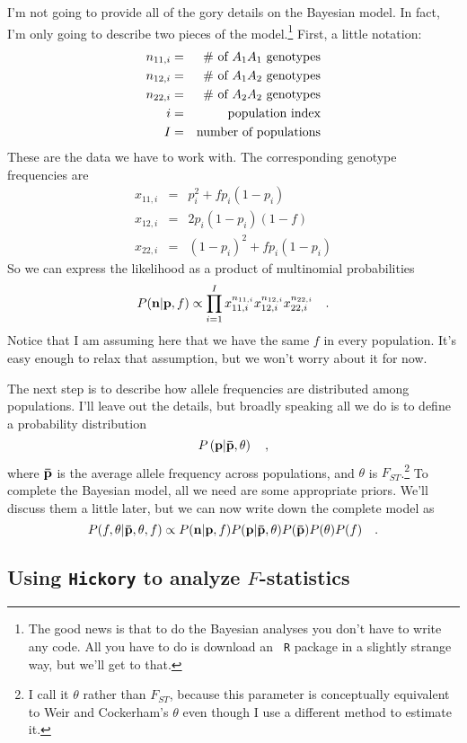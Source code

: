 I'm not going to provide all of the gory details on the Bayesian
model. In fact, I'm only going to describe two pieces of the
model.\footnote{The good news is that to do the Bayesian analyses you
  don't have to write any code. All you have to do is download an {\tt
    R} package in a slightly strange way, but we'll get to that.}
First, a little notation:
\begin{eqnarray*}
n_{11,i} &=& \hbox{\# of $A_1A_1$ genotypes} \\
n_{12,i} &=& \hbox{\# of $A_1A_2$ genotypes} \\
n_{22,i} &=& \hbox{\# of $A_2A_2$ genotypes} \\
i         &=& \hbox{population index} \\
I         &=& \hbox{number of populations} \\
\end{eqnarray*}
These are the data we have to work with. The corresponding genotype
frequencies are
\begin{eqnarray*}
x_{11,i} &=& p_{i}^2 + fp_{i}(1-p_{i}) \\
x_{12,i} &=& 2p_{i}(1-p_{i})(1-f) \\
x_{22,i} &=& (1-p_{i})^2 + fp_{i}(1-p_{i})
\end{eqnarray*}
So we can express the likelihood %
as a product of multinomial probabilities
\[
P({\bf n}|{\bf p},f) \propto \prod_{i=1}^I x_{11,i}^{n_{11,i}}
x_{12,i}^{n_{12,i}} x_{22,i}^{n_{22,i}} \quad .
\]
Notice that I am assuming here that we have the same $f$ in every
population. It's easy enough to relax that assumption, but we won't
worry about it for now.

The next step is to describe how allele frequencies are distributed
among populations. I'll leave out the details, but broadly speaking
all we do is to define a probability distribution
\[
P\left(\bf p|{\bf\bar p}, \theta\right) \quad ,
\]
where $\bf\bar p$ is the average allele frequency across populations,
and $\theta$ is $F_{ST}$.\footnote{I call it $\theta$ rather than
  $F_{ST}$, because this parameter is conceptually equivalent to Weir
  and Cockerham's $\theta$ even though I use a different method to
  estimate it.}
To complete the Bayesian model, all we need
are some appropriate priors. We'll discuss them a little
later, but we can now write down the complete model as
\[
P(f,\theta|{\bf\bar p},\theta,f) \propto
P({\bf n}|{\bf p},f) P({\bf p}|{\bf\bar p},\theta) P({\bf\bar
  p})P(\theta)P(f) \quad .
\]

\subsection*{Using {\tt Hickory} to analyze $F$-statistics}

